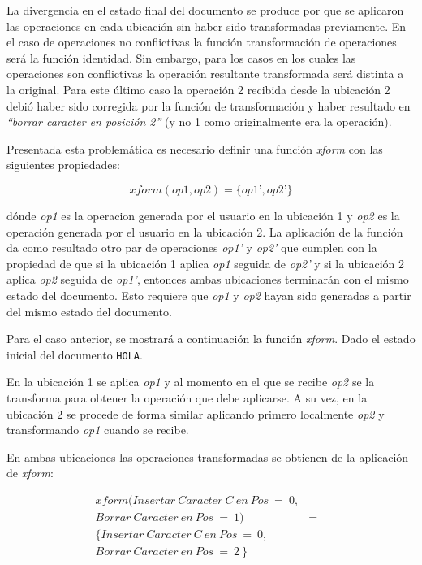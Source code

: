 \documentclass[12pt,a4paper]{article}
\begin{document}
	La divergencia en el estado final del documento se produce por que se aplicaron las operaciones en cada 
	ubicación sin haber sido transformadas previamente. En el caso de operaciones no conflictivas la función
	transformación de operaciones será la función  identidad. Sin embargo, para los casos en los cuales las
	operaciones son conflictivas la operación resultante transformada será distinta a la original.
	Para este último caso la operación 2 recibida desde la ubicación 2 debió haber sido corregida por la función
	de transformación y haber resultado en \textit{“borrar caracter en posición 2”} (y no 1 como originalmente
	era la operación).
	
	Presentada esta problemática es necesario definir una función \textit{xform} con las siguientes propiedades:
	
	\begin{equation} xform(op1,op2) = \lbrace op1’,op2’ \rbrace
	\end{equation}

	dónde \textit{op1} es la operacion generada por el usuario en la ubicación 1 y \textit{op2} es la operación
	generada por el usuario en la ubicación 2. La aplicación de la función da como resultado otro par de operaciones
	\textit{op1’} y \textit{op2’} que cumplen con la propiedad de que si la ubicación 1 aplica \textit{op1} seguida
	de  \textit{op2’}  y si la ubicación 2 aplica \textit{op2} seguida de \textit{op1’}, entonces ambas
	ubicaciones terminarán con el mismo estado del documento.
	Esto requiere que \textit{op1} y \textit{op2} hayan sido generadas a partir del mismo estado del documento.

	Para el caso anterior, se mostrará a continuación la función \textit{xform}.
	Dado el estado inicial del documento \texttt{HOLA}.

	En la ubicación 1 se aplica \textit{op1} y al momento en el que se recibe \textit{op2} se la transforma 
	para obtener la operación que debe aplicarse. A su vez, en la ubicación 2 se procede de forma similar
	aplicando primero localmente \textit{op2} y transformando \textit{op1} cuando se recibe.

	En ambas ubicaciones las operaciones transformadas se obtienen de la aplicación de \textit{xform}:
	
\begin{eqnarray*}
  xform(Insertar\ Caracter\ C\ en\ Pos\ =\ 0, \\
  Borrar\ Caracter\ en\ Pos\ =\ 1) & = & \\ 
  \lbrace Insertar\ Caracter\ C\ en\ Pos\ =\ 0, \\
  Borrar\ Caracter\ en\ Pos\ =\ 2\ \rbrace  
\end{eqnarray*}
\end{document}
